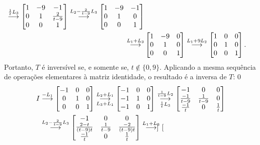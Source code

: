 \documentclass[12pt,a4paper]{article}
\newcommand{\grstep}[2][\relax]{%
   \ensuremath{\mathrel{
       {\mathop{\longrightarrow}\limits^{#2\mathstrut}_{
                                     \begin{subarray}{l} #1 \end{subarray}}}}}}
\begin{document}
\begin{enumerate}
\begin{align*}
\grstep{ \frac{1}{t} L_3 }
\begin{bmatrix}
1 & -9 & -1 \\
0 & 1 & \frac{2}{t-9} \\
0 & 0 & 1
\end{bmatrix}
\grstep{ L_2 -\frac{2}{t-9} L_3 }
\begin{bmatrix}
1 & -9 & -1 \\
0 & 1 & 0 \\
0 & 0 & 1
\end{bmatrix}\\
\grstep{ L_1 + L_3 }
&\begin{bmatrix}
1 & -9 & 0 \\
0 & 1 & 0 \\
0 & 0 & 1
\end{bmatrix}
\grstep{ L_1 + 9L_2 }
\begin{bmatrix}
1 & 0 & 0 \\
0 & 1 & 0 \\
0 & 0 & 1
\end{bmatrix}.
\end{align*}
Portanto, $T$ é inversível se, e somente se, $t \not \in \{0, 9\}$.
Aplicando a mesma sequência de operações elementares à matriz identidade, o resultado é a inversa de $T$:
0\begin{align*}
I
& \grstep{ -L_1 }
\begin{bmatrix}
-1 & 0 & 0 \\
 0 & 1 & 0 \\
 0 & 0 & 1
\end{bmatrix}
\grstep[ L_3 + L_1 ]{ L_2 + L_1 }
\begin{bmatrix}
-1 & 0 & 0 \\
-1 & 1 & 0 \\
-1 & 0 & 1
\end{bmatrix}
\grstep[\frac{1}{t} L_3]{ \frac{1}{t-9} L_2 }
\begin{bmatrix}
-1 & 0 & 0 \\
\frac{-1}{t-9} & \frac{1}{t-9} & 0 \\
\frac{-1}{t} & 0 & \frac{1}{t}
\end{bmatrix} \\
& \grstep{ L_2 -\frac{2}{t-9} L_3 }
\begin{bmatrix}
-1 & 0 & 0 \\
\frac{2-t}{(t-9)t} & \frac{1}{t-9} & \frac{-2}{(t-9)t} \\
\frac{-1}{t} & 0 & \frac{1}{t}
\end{bmatrix}
\grstep{ L_1 + L_3 }
\begin{bmatrix}

\end{bmatrix}
\end{align*}
\end{enumerate}
\end{document}
